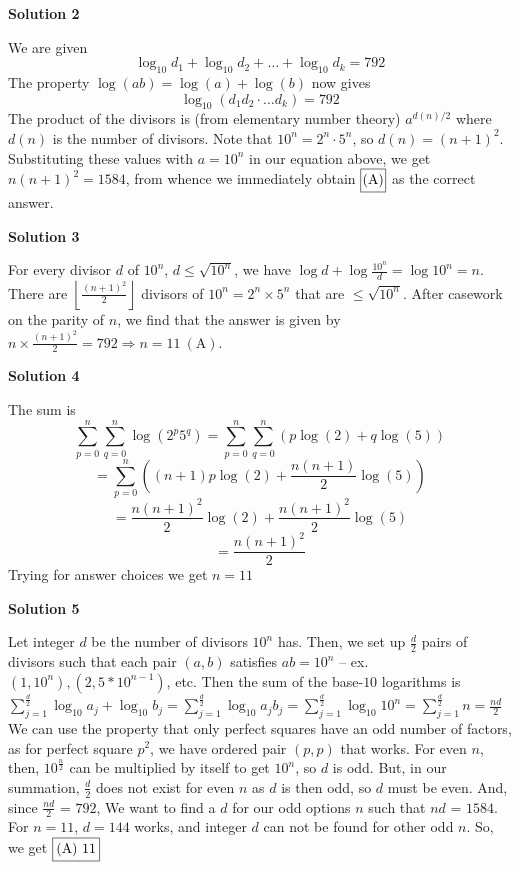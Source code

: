 \begin{enumerate}
\textbf{Solution 2}

We are given 
 \[\log_{10}d_1 + \log_{10}d_2 + \ldots + \log_{10}d_k = 792\] The property $\log(ab) = \log(a)+\log(b)$ now gives 
 \[\log_{10}(d_1 d_2\cdot\ldots d_k) = 792\] The product of the divisors is (from elementary number theory) $a^{d(n)/2}$ where $d(n)$ is the number of divisors. Note that $10^n = 2^n\cdot 5^n$, so $d(n) = (n + 1)^2$. Substituting these values with $a = 10^n$ in our equation above, we get $n(n + 1)^2 = 1584$, from whence we immediately obtain $\framebox[1.2\width]{(A)}$ as the correct answer.

 



\textbf{Solution 3}

For every divisor $d$ of $10^n$, $d \le \sqrt{10^n}$, we have $\log d + \log \frac{10^n}{d} = \log 10^n = n$. There are $\left \lfloor \frac{(n+1)^2}{2} \right \rfloor$ divisors of $10^n = 2^n \times 5^n$ that are $\le \sqrt{10^n}$. After casework on the parity of $n$, we find that the answer is given by $n \times \frac{(n+1)^2}{2} = 792 \Longrightarrow n = 11\ \mathrm{(A)}$.

 



\textbf{Solution 4}

The sum is
 \[\sum_{p=0}^{n}\sum_{q=0}^{n} \log(2^p5^q) = \sum_{p=0}^{n}\sum_{q=0}^{n}(p\log(2)+q\log(5))\]
 \[= \sum_{p=0}^{n} ((n+1)p\log(2) + \frac{n(n+1)}{2}\log(5))\]
 \[= \frac{n(n+1)^2}{2} \log(2) + \frac{n(n+1)^2}{2} \log(5)\]
 \[= \frac{n(n+1)^2}{2}\]Trying for answer choices we get $n=11$




\textbf{Solution 5}

Let integer $d$ be the number of divisors $10^n$ has. Then, we set up $\frac{d}{2}$ pairs of divisors such that each pair $(a,b)$ satisfies $ab = 10^n$ -- ex. $(1, 10^n), (2, 5*10^{n-1})$, etc. Then the sum of the base-$10$ logarithms is $\sum_{j=1}^{\frac{d}{2}} \log_{10} a_j + \log_{10} b_j = \sum_{j=1}^{\frac{d}{2}} \log_{10} a_j b_j = \sum_{j=1}^{\frac{d}{2}} \log_{10} 10^n = \sum_{j=1}^{\frac{d}{2}} n = \frac{nd}{2}$We can use the property that only perfect squares have an odd number of factors, as for perfect square $p^2$, we have ordered pair $(p,p)$ that works. For even $n$, then, $10^{\frac{n}{2}}$ can be multiplied by itself to get $10^n$, so $d$ is odd. But, in our summation, $\frac{d}{2}$ does not exist for even $n$ as $d$ is then odd, so $d$ must be even. And, since $\frac{nd}{2}$ = $792$, We want to find a $d$ for our odd options $n$ such that $nd$ = $1584$. For $n=11$, $d=144$ works, and integer $d$ can not be found for other odd $n$. So, we get $\framebox[1.2\width]{(A) 11}$


\end{enumerate}

